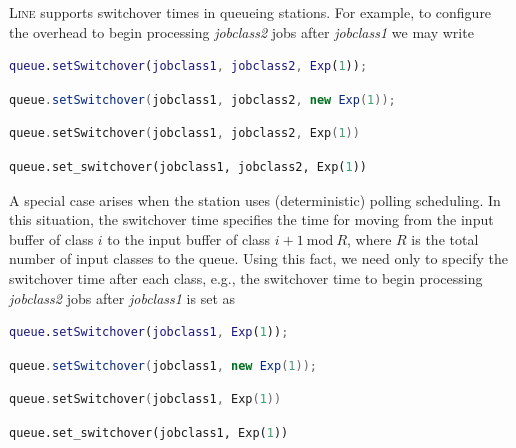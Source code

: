 \textsc{Line} supports switchover times in queueing stations. For example, to configure the overhead to begin processing \textit{jobclass2} jobs after \textit{jobclass1} we may write
\begin{MATLAB}
\begin{lstlisting}[language = matlab]
queue.setSwitchover(jobclass1, jobclass2, Exp(1));
\end{lstlisting}
\end{MATLAB}
\begin{JAVA}
\begin{lstlisting}[language=java, basicstyle=\ttfamily\scriptsize]
queue.setSwitchover(jobclass1, jobclass2, new Exp(1));
\end{lstlisting}
\end{JAVA}
\begin{KOTLIN}
\begin{lstlisting}[language=kotlin, basicstyle=\ttfamily\scriptsize]
queue.setSwitchover(jobclass1, jobclass2, Exp(1))
\end{lstlisting}
\end{KOTLIN}
\begin{PYTHON}
\begin{lstlisting}[language=python]
queue.set_switchover(jobclass1, jobclass2, Exp(1))
\end{lstlisting}
\end{PYTHON}
A special case arises when the station uses (deterministic) polling scheduling. In this situation, the switchover time specifies the time for moving from the input buffer of class $i$ to the input buffer of class $i+1~\text{mod}~R$, where $R$ is the total number of input classes to the queue. Using this fact, we need only to specify the switchover time after each class, e.g., the switchover time to begin processing \textit{jobclass2} jobs after \textit{jobclass1} is set as
\begin{MATLAB}
\begin{lstlisting}[language = matlab]
queue.setSwitchover(jobclass1, Exp(1));
\end{lstlisting}
\end{MATLAB}
\begin{JAVA}
\begin{lstlisting}[language=java, basicstyle=\ttfamily\scriptsize]
queue.setSwitchover(jobclass1, new Exp(1));
\end{lstlisting}
\end{JAVA}
\begin{KOTLIN}
\begin{lstlisting}[language=kotlin, basicstyle=\ttfamily\scriptsize]
queue.setSwitchover(jobclass1, Exp(1))
\end{lstlisting}
\end{KOTLIN}
\begin{PYTHON}
\begin{lstlisting}[language=python]
queue.set_switchover(jobclass1, Exp(1))
\end{lstlisting}
\end{PYTHON}

